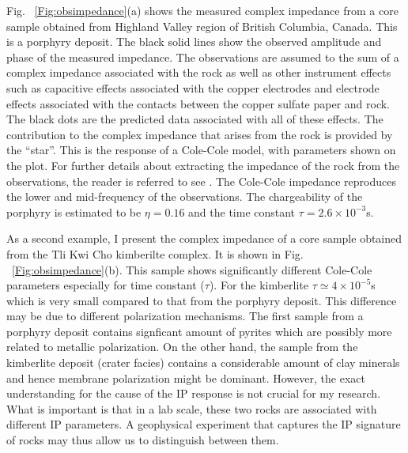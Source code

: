 \documentclass[letterpaper,11pt]{article}
\begin{document}
Fig. ~\ref{Fig:obsimpedance}(a) shows the measured complex impedance from a core sample obtained from Highland Valley region of British Columbia, Canada. This is a porphyry deposit. The black solid lines show the observed amplitude and phase of the measured impedance. The observations are assumed to the sum of a complex impedance associated with the rock as well as other instrument effects such as capacitive effects associated with the copper electrodes and electrode effects associated with the contacts between the copper sulfate paper and rock. The black dots are the predicted data associated with all of these effects. The contribution to the complex impedance that arises from the rock is provided by the ``star''. This is the response of a Cole-Cole model, with parameters shown on the plot.  For further details about extracting the impedance of the rock from the observations, the reader is referred to see \cite{Enkin2012}. The Cole-Cole impedance reproduces the lower and mid-frequency of the observations. The chargeability of the porphyry is estimated to be $\eta=0.16$ and the time constant $\tau=2.6\times10^{-3}$s. 


 As a second example, I present the complex impedance of a core sample obtained from the Tli Kwi Cho kimberilte complex. It is shown in Fig. ~\ref{Fig:obsimpedance}(b). This sample shows significantly different Cole-Cole parameters especially for time constant ($\tau$). For the kimberlite $\tau \simeq 4\times10^{-5}$s which is very small compared to that from the porphyry deposit. This difference may be due to different polarization mechanisms. The first sample from a porphyry deposit contains signficant amount of pyrites which are possibly more related to metallic polarization. On the other hand, the sample from the kimberlite deposit (crater facies) contains a considerable amount of clay minerals and hence membrane polarization might be dominant. However, the exact understanding for the cause of the IP response is not crucial for my research. What is important is that in a lab scale, these two rocks are associated with different IP parameters.  A geophysical experiment that captures the IP signature of rocks may thus allow us to distinguish between them. 
\end{document}
